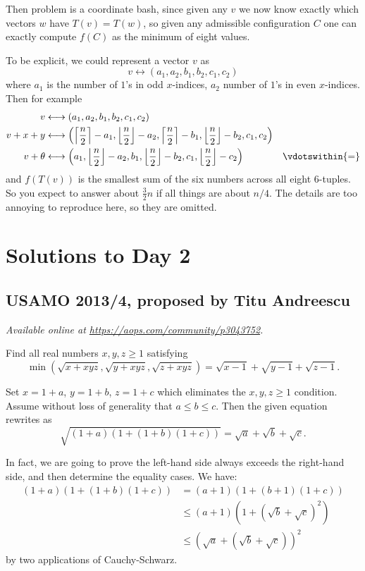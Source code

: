 \documentclass[11pt]{scrartcl}
\begin{document}
Then problem is a coordinate bash,
since given any $v$ we now know exactly which vectors $w$
have $T(v) = T(w)$, so given any admissible configuration $C$
one can exactly compute $f(C)$ as the minimum of eight values.

To be explicit, we could represent a vector $v$ as
\[ v \longleftrightarrow (a_1, a_2, b_1, b_2, c_1, c_2) \]
where $a_1$ is the number of $1$'s in odd $x$-indices,
$a_2$ number of $1$'s in even $x$-indices.
Then for example
\begin{align*}
  v &\longleftrightarrow (a_1, a_2, b_1, b_2, c_1, c_2) \\
  v+x+y &\longleftrightarrow \left( \left\lceil \frac n2 \right\rceil - a_1,
    \left\lfloor \frac n2 \right\rfloor - a_2,
    \left\lceil \frac n2  \right\rceil - b_1,
    \left\lfloor \frac n2 \right\rfloor - b_2, c_1, c_2 \right) \\
  v+\theta &\longleftrightarrow \left(a_1, \left\lfloor \frac n2  \right\rfloor - a_2, b_1,
    \left\lfloor \frac n2 \right\rfloor -
    b_2, c_1, \left\lfloor \frac n2 \right\rfloor - c_2\right)
  &\vdotswithin{=}
\end{align*}
and $f(T(v))$ is the smallest sum of the six numbers across all eight $6$-tuples.
So you expect to answer about $\frac32 n$
if all things are about $n/4$.
The details are too annoying to reproduce here, so they are omitted.
\pagebreak

\section{Solutions to Day 2}
\subsection{USAMO 2013/4, proposed by Titu Andreescu}
\textsl{Available online at \url{https://aops.com/community/p3043752}.}
\begin{mdframed}[style=mdpurplebox,frametitle={Problem statement}]
Find all real numbers $x,y,z \ge 1$ satisfying
\[ \min \left( \sqrt{x+xyz}, \sqrt{y+xyz}, \sqrt{z+xyz} \right)
  = \sqrt{x-1} + \sqrt{y-1} + \sqrt{z-1}. \]
\end{mdframed}
Set $x = 1+a$, $y = 1+b$, $z = 1+c$
which eliminates the $x,y,z \ge 1$ condition.
Assume without loss of generality that $a \leq b \leq c$.
Then the given equation rewrites as
\[ \sqrt{(1+a)\left( 1+(1+b)(1+c) \right)} = \sqrt a + \sqrt b + \sqrt c. \]

In fact, we are going to prove the left-hand side always exceeds the
right-hand side, and then determine the equality cases.
We have:
\begin{align*}
  (1+a)\left( 1 + (1+b)(1+c) \right)
  &= (a+1)\left( 1 + (b+1)(1+c) \right) \\
  &\le (a+1) \left( 1 + \left( \sqrt b + \sqrt c \right)^2 \right) \\
  &\le \left( \sqrt a + \left( \sqrt b + \sqrt c \right) \right)^2
\end{align*}
by two applications of Cauchy-Schwarz.
\end{document}
